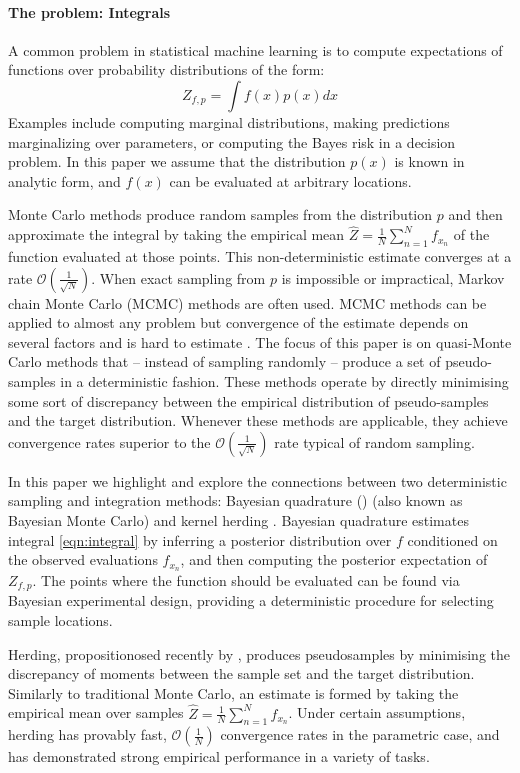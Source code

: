 \paragraph{The problem: Integrals} A common problem in statistical machine learning is to compute expectations of functions over probability distributions of the form:
\begin{equation}
	Z_{f,p} = \int f(x) p(x) dx \label{eqn:integral}
\end{equation}
Examples include computing marginal distributions, making predictions marginalizing over parameters, or computing the Bayes risk in a decision problem. In this paper we assume that the distribution $p(x)$ is known in analytic form, and $f(x)$ can be evaluated at arbitrary locations.

Monte Carlo methods produce random samples from the distribution $p$ and then approximate the integral by taking the empirical mean $\hat{Z} = \frac{1}{N}\sum_{n=1}^{N}f_{x_n}$ of the function evaluated at those points. This non-deterministic estimate converges at a rate $\mathcal{O}(\frac{1}{\sqrt{N}})$. When exact sampling from $p$ is impossible or impractical, Markov chain Monte Carlo (MCMC) methods are often used. MCMC methods can be applied to almost any problem but convergence of the estimate depends on several factors and is hard to estimate \citep{CowlesCarlin96}. The focus of this paper is on quasi-Monte Carlo methods that -- instead of sampling randomly -- produce a set of pseudo-samples in a deterministic fashion. These methods operate by directly minimising some sort of discrepancy between the empirical distribution of pseudo-samples and the target distribution. Whenever these methods are applicable, they achieve convergence rates superior to the $\mathcal{O}(\frac{1}{\sqrt{N}})$ rate typical of random sampling.

In this paper we highlight and explore the connections between two deterministic sampling and integration methods: Bayesian quadrature (\bq{}) \citep{BZHermiteQuadrature,BZMonteCarlo} (also known as Bayesian Monte Carlo) and kernel herding \citep{chen2010super}. Bayesian quadrature estimates integral \eqref{eqn:integral} by inferring a posterior distribution over $f$ conditioned on the observed evaluations $f_{x_n}$, and then computing the posterior expectation of $Z_{f,p}$. The points where the function should be evaluated can be found via Bayesian experimental design, providing a deterministic procedure for selecting sample locations.

Herding, propositionosed recently by \citep{chen2010super}, produces pseudosamples by minimising the discrepancy of moments between the sample set and the target distribution. Similarly to traditional Monte Carlo, an estimate is formed by taking the empirical mean over samples $\hat{Z} = \frac{1}{N}\sum_{n=1}^{N}f_{x_n}$. Under certain assumptions, herding has provably fast, $\mathcal{O}(\frac{1}{N})$ convergence rates in the parametric case, and has demonstrated strong empirical performance in a variety of tasks.

